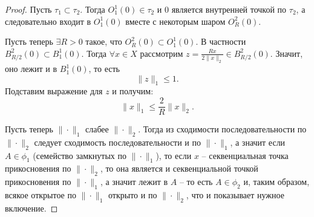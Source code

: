 \begin{proof}
    Пусть $\tau_1 \subset \tau_2$.
    Тогда $O_1^1(0) \in \tau_2$ и $0$ является внутренней точкой по $\tau_2$, а следовательно входит в $O_1^1(0)$ вместе с некоторым шаром $O_R^2(0)$.

    Пусть теперь $\exists R > 0$ такое, что $O_R^2(0) \subset O_1^1(0)$.
    В частности $B_{R/2}^2(0) \subset B_1^1(0)$.
    Тогда $\forall x \in X$ рассмотрим $z = \frac{Rx}{2\|x\|_2} \in B_{R/2}^2(0)$.
    Значит, оно лежит и в $B_1^1(0)$, то есть
    \[
        \|z\|_1 \leq 1.
    \]
    Подставим выражение для $z$ и получим:
    \[
        \|x\|_1 \leq \frac{2}{R}\|x\|_2.
    \]

    Пусть теперь $\|\cdot\|_1$ слабее $\|\cdot\|_2$.
    Тогда из сходимости последовательности по $\|\cdot\|_2$ следует сходимость последовательности и по $\|\cdot\|_1$, а значит если $A \in \phi_1$ (семейство замкнутых по $\|\cdot\|_1$), то если $x$ -- секвенциальная точка прикосновения по $\|\cdot\|_2$, то она является и секвенциальной точкой прикосновения по $\|\cdot\|_1$, а значит лежит в $A$ -- то есть $A \in \phi_2$ и, таким образом, всякое открытое по $\|\cdot\|_1$ открыто и по $\|\cdot\|_2$, что и показывает нужное включение.
\end{proof}

